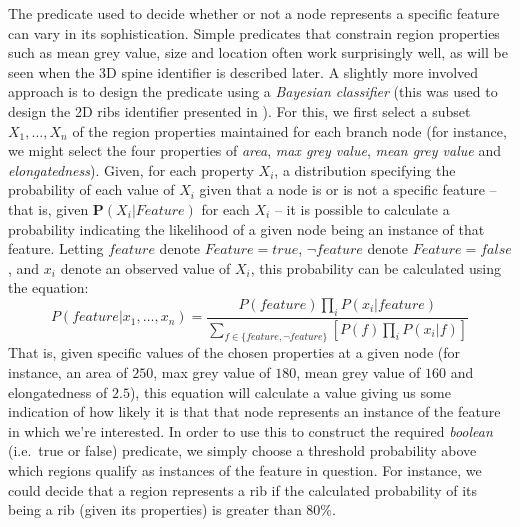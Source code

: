 The predicate used to decide whether or not a node represents a specific feature can vary in its sophistication. Simple predicates that constrain region properties such as mean grey value, size and location often work surprisingly well, as will be seen when the 3D spine identifier is described later. A slightly more involved approach is to design the predicate using a \emph{Bayesian classifier} (this was used to design the 2D ribs identifier presented in \cite{gvccimi08}). For this, we first select a subset $X_1,\ldots,X_n$ of the region properties maintained for each branch node (for instance, we might select the four properties of \emph{area}, \emph{max grey value}, \emph{mean grey value} and \emph{elongatedness}). Given, for each property $X_i$, a distribution specifying the probability of each value of $X_i$ given that a node is or is not a specific feature -- that is, given $\mathbf{P}(X_i | \textit{Feature})$ for each $X_i$ -- it is possible to calculate a probability indicating the likelihood of a given node being an instance of that feature. Letting $\mathit{feature}$ denote $\mathit{Feature} = \mathit{true}$, $\neg \mathit{feature}$ denote $\mathit{Feature} = \mathit{false}$, and $x_i$ denote an observed value of $X_i$, this probability can be calculated using the equation:
%
\[
P(\mathit{feature}|x_1,\ldots,x_n) = \frac{P(\mathit{feature}) \displaystyle \prod_i P(x_i|\mathit{feature})}{\displaystyle \sum_{f \in \{\mathit{feature},\neg \mathit{feature}\}} \left[ P(f) \displaystyle \prod_i P(x_i|f) \right]}
\]
%
That is, given specific values of the chosen properties at a given node (for instance, an area of $250$, max grey value of $180$, mean grey value of $160$ and elongatedness of $2.5$), this equation will calculate a value giving us some indication of how likely it is that that node represents an instance of the feature in which we're interested. In order to use this to construct the required \emph{boolean} (i.e.~true or false) predicate, we simply choose a threshold probability above which regions qualify as instances of the feature in question. For instance, we could decide that a region represents a rib if the calculated probability of its being a rib (given its properties) is greater than $80\%$.

